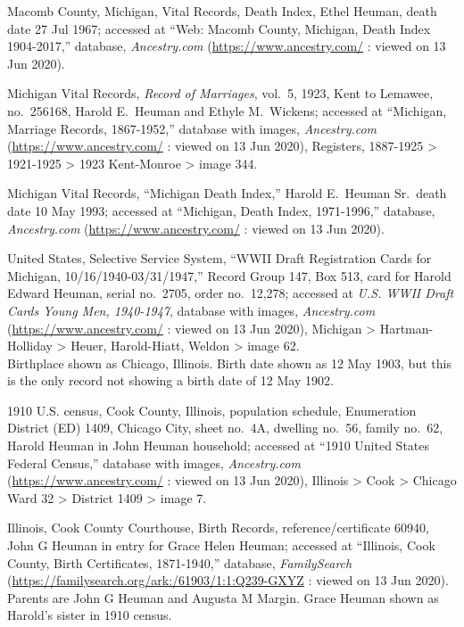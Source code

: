 \begin{thebibliography}{999}
	Macomb County, Michigan, Vital Records, Death Index, Ethel Heuman, death date 27 Jul 1967; accessed at ``Web: Macomb County, Michigan, Death Index 1904-2017,'' database, \textit{Ancestry.com} (\url{https://www.ancestry.com/} : viewed on 13 Jun 2020).
	
	Michigan Vital Records, \textit{Record of Marriages}, vol.\ 5, 1923, Kent to Lemawee, no.\ 256168, Harold E.\ Heuman and Ethyle M.\ Wickens; accessed at ``Michigan, Marriage Records, 1867-1952,'' database with images, \textit{Ancestry.com} (\url{https://www.ancestry.com/} : viewed on 13 Jun 2020),  Registers, 1887-1925 > 1921-1925 > 1923 Kent-Monroe > image 344.
	
	Michigan Vital Records, ``Michigan Death Index,'' Harold E.\ Heuman Sr.\, death date 10 May 1993; accessed at ``Michigan, Death Index, 1971-1996,'' database, \textit{Ancestry.com} (\url{https://www.ancestry.com/} : viewed on 13 Jun 2020).
	
	United States, Selective Service System, ``WWII Draft Registration Cards for Michigan, 10/16/1940-03/31/1947,'' Record Group 147, Box 513, card for Harold Edward Heuman, serial no.\ 2705, order no.\ 12,278; accessed at \textit{U.S. WWII Draft Cards Young Men, 1940-1947}, database with images, \textit{Ancestry.com} (\url{https://www.ancestry.com/} : viewed on 13 Jun 2020), Michigan > Hartman-Holliday > Heuer, Harold-Hiatt, Weldon > image 62.\\
	Birthplace shown as Chicago, Illinois. Birth date shown as 12 May 1903, but this is the only record not showing a birth date of 12 May 1902.
	
	1910 U.S. census, Cook County, Illinois, population schedule, Enumeration District (ED) 1409, Chicago City, sheet no.\ 4A, dwelling no.\ 56, family no.\ 62, Harold Heuman in John Heuman household; accessed at ``1910 United States Federal Census,'' database with images, \textit{Ancestry.com} (\url{https://www.ancestry.com/} : viewed on 13 Jun 2020), Illinois > Cook > Chicago Ward 32 > District 1409 > image 7.
	
	Illinois, Cook County Courthouse, Birth Records, reference/certificate 60940, John G Heuman in entry for Grace Helen Heuman; accessed at ``Illinois, Cook County, Birth Certificates, 1871-1940,'' database, \textit{FamilySearch} (\url{https://familysearch.org/ark:/61903/1:1:Q239-GXYZ} : viewed on 13 Jun 2020).\\
	Parents are John G Heuman and Augusta M Margin. Grace Heuman shown as Harold's sister in 1910 census.
	

\end{thebibliography}
